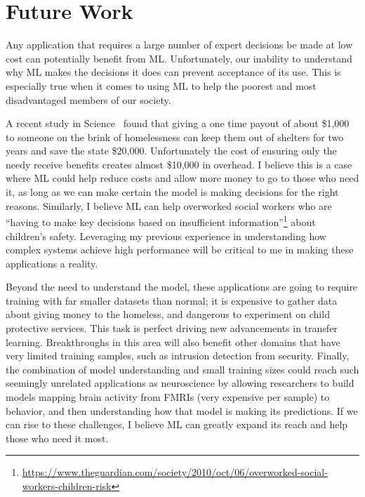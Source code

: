 \documentclass[a4paper, 11pt]{article}
\begin{document}
\section{Future Work}
Any application that requires a large number of expert decisions be made at low
cost can potentially benefit from ML. Unfortunately, our inability to understand
why ML makes the decisions it does can prevent acceptance of its use. This is
especially true when it comes to using ML to help the poorest and most disadvantaged
members of our society.

A recent study in Science~\cite{evans:2016:homelessness} found that
giving a one time payout of about \$1,000 to someone on the brink of homelessness
can keep them out of shelters for two years and save the state \$20,000. Unfortunately the cost
of ensuring only the needy receive benefits creates almost \$10,000 in overhead.
I believe this is a case where ML could help reduce costs and allow more money to go to
those who need it, as long as we can make certain the model is making decisions for the right reasons.
Similarly, I believe ML can help overworked social workers who are
``having to make key decisions based on insufficient
information''\footnote{\url{https://www.theguardian.com/society/2010/oct/06/overworked-social-workers-children-risk}}
about children's safety.
Leveraging my previous experience in understanding how complex systems achieve high performance
will be critical to me in making these applications a reality.

Beyond the need to understand the model, these applications are going to require training
with far smaller datasets than normal; it is expensive to gather data about giving money
to the homeless, and dangerous to experiment on child protective services. This
task is perfect driving new advancements in transfer learning. Breakthroughs
in this area will also benefit other domains that have very limited training samples,
such as intrusion detection from security. Finally, the combination of model understanding
and small training sizes could reach such seemingly unrelated applications as neuroscience
by allowing researchers to build models mapping brain activity from FMRIs (very expensive per sample)
to behavior, and then understanding how that model is making its predictions.
If we can rise to these challenges, I believe ML can greatly expand its reach
and help those who need it most.


\small



\end{document}
